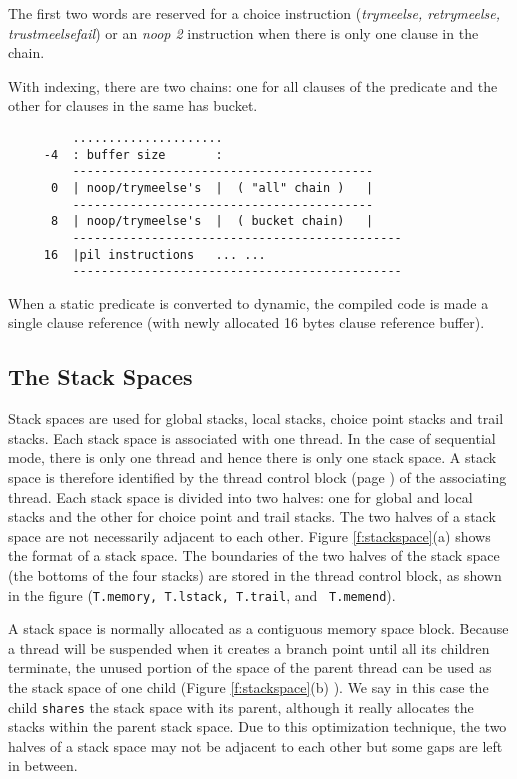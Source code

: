 \documentclass[11pt]{article}
\begin{document}
\begin{enumerate}
	The first two words are reserved for a choice instruction
	({\it trymeelse, retrymeelse, trustmeelsefail}) or an {\it noop 2}
	instruction when there is only one clause in the chain.

        With indexing, there are two chains: one for all clauses
	of the predicate and the other for clauses in the same has bucket.

\begin{verbatim}
         .....................
     -4  : buffer size       :
         ------------------------------------------
      0  | noop/trymeelse's  |  ( "all" chain )   |
         ------------------------------------------
      8  | noop/trymeelse's  |  ( bucket chain)   |
         ----------------------------------------------
     16  |pil instructions   ... ...
         ----------------------------------------------
\end{verbatim}

	When a static predicate is converted to dynamic, the compiled
	code is made a single clause reference (with newly allocated
	16 bytes clause reference buffer).
\end{enumerate}


\subsection{The Stack Spaces}

Stack spaces are used for global stacks, local stacks, choice point
stacks and trail stacks.  Each stack space is associated with one
thread. In the case of sequential mode, there is only one thread and
hence there is only one stack space.  A stack space is therefore
identified by the thread control block (page \pageref{pg:tcb}) of the
associating thread.  Each stack space is divided into two halves: one
for global and local stacks and the other for choice point and trail
stacks.  The two halves of a stack space are not necessarily adjacent
to each other.  Figure \ref{f:stackspace}(a) shows the format of a
stack space.  The boundaries of the two halves of the stack space (the
bottoms of the four stacks) are stored in the thread control block, as
shown in the figure ({\tt T.memory, T.lstack, T.trail}, and {\tt
T.memend}).

A stack space is normally allocated as a contiguous memory space
block.  Because a thread will be suspended when it creates a branch
point until all its children terminate, the unused portion of the
space of the parent thread can be used as the stack space of one child
(Figure \ref{f:stackspace}(b) ). We say in this case the child
{\tt shares} the stack space with its parent, although it really
allocates the stacks within the parent stack space.  Due to this
optimization technique, the two halves of a stack space may not be
adjacent to each other but some gaps are left in between.
\end{document}
